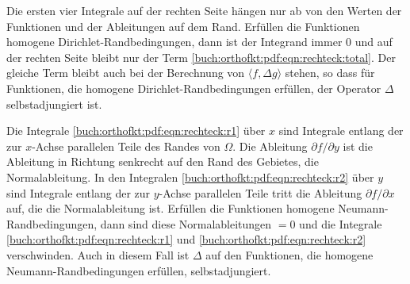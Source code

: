 Die ersten vier Integrale auf der rechten Seite hängen nur ab
von den Werten der Funktionen und der Ableitungen auf dem Rand.
Erfüllen die Funktionen homogene Dirichlet-Randbedingungen, dann
ist der Integrand immer 0 und auf der rechten Seite bleibt nur
der Term \eqref{buch:orthofkt:pdf:eqn:rechteck:total}.
Der gleiche Term bleibt auch bei der Berechnung von
$\langle f,\Delta g\rangle$
stehen, so dass für Funktionen, die homogene Dirichlet-Randbedingungen
erfüllen, der Operator $\Delta$ selbstadjungiert ist.

Die Integrale
\eqref{buch:orthofkt:pdf:eqn:rechteck:r1}
über $x$ sind Integrale entlang der zur $x$-Achse parallelen Teile des
Randes von $\Omega$.
Die Ableitung $\partial f/\partial y$ ist die Ableitung in Richtung
senkrecht auf den Rand des Gebietes, die Normalableitung.
In den Integralen
\eqref{buch:orthofkt:pdf:eqn:rechteck:r2}
über $y$ sind Integrale entlang der zur $y$-Achse parallelen Teile
tritt die Ableitung $\partial f/\partial x$ auf, die die Normalableitung
ist.
Erfüllen die Funktionen homogene Neumann-Randbedingungen, dann sind
diese Normalableitungen $=0$ und die Integrale
\eqref{buch:orthofkt:pdf:eqn:rechteck:r1}
und
\eqref{buch:orthofkt:pdf:eqn:rechteck:r2}
verschwinden.
Auch in diesem Fall ist $\Delta$ auf den Funktionen, die homogene
Neumann-Randbedingungen erfüllen, selbstadjungiert.

%
%
